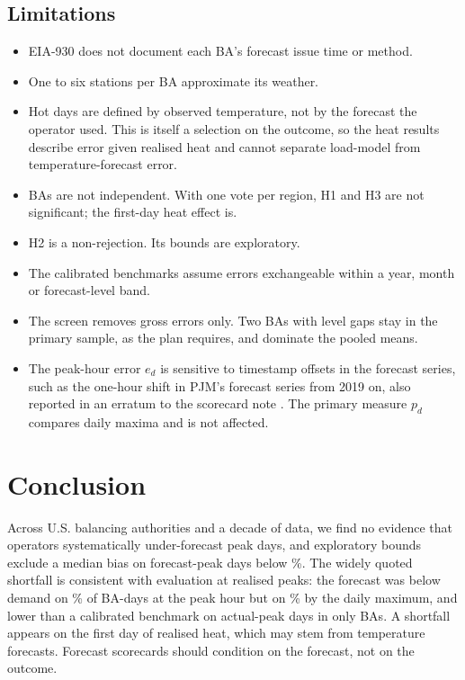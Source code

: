 \documentclass[conference,a4paper]{IEEEtran}
\begin{document}
\subsection*{Limitations}
\begin{itemize}
\item EIA-930 does not document each BA's forecast issue time or method.
\item One to six stations per BA approximate its weather.
\item Hot days are defined by observed temperature, not by the forecast the operator used. This is itself a selection on the outcome, so the heat results describe error given realised heat and cannot separate load-model from temperature-forecast error.
\item BAs are not independent. With one vote per region, H1 and H3 are not significant; the first-day heat effect is.
\item H2 is a non-rejection. Its bounds are exploratory.
\item The calibrated benchmarks assume errors exchangeable within a year, month or forecast-level band.
\item The screen removes gross errors only. Two BAs with level gaps stay in the primary sample, as the plan requires, and dominate the pooled means.
\item The peak-hour error $e_d$ is sensitive to timestamp offsets in the forecast series, such as the one-hour shift in PJM's forecast series from 2019 on, also reported in an erratum to the scorecard note \cite{guerrafilho2026note}. The primary measure $p_d$ compares daily maxima and is not affected.
\end{itemize}

\section{Conclusion}
Across  U.S. balancing authorities and a decade of data, we find no evidence that operators systematically under-forecast peak days, and exploratory bounds exclude a median bias on forecast-peak days below \%. The widely quoted shortfall is consistent with evaluation at realised peaks: the forecast was below demand on \% of BA-days at the peak hour but on \% by the daily maximum, and lower than a calibrated benchmark on actual-peak days in only  BAs. A shortfall appears on the first day of realised heat, which may stem from temperature forecasts. Forecast scorecards should condition on the forecast, not on the outcome.
\end{document}
